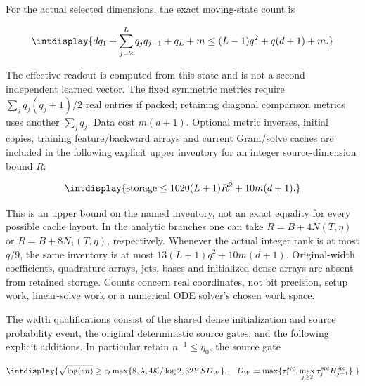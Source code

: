 
For the actual selected dimensions, the exact moving-state count is


\begingroup\renewcommand{\theHequation}{intdisplay.193}
\begin{equation}
\intdisplay{
dq_1+\sum_{j=2}^Lq_jq_{j-1}+q_L+m
\le(L-1)q^2+q(d+1)+m.
}
\label{int:eq-0081-harmonic-exact-learned-count}
\end{equation}
\endgroup


The effective readout is computed from this state and is not a second independent learned vector. The fixed symmetric metrics require \(\sum_jq_j(q_j+1)/2\) real entries if packed; retaining diagonal comparison metrics uses another \(\sum_jq_j\). Data cost \(m(d+1)\). Optional metric inverses, initial copies, training feature/backward arrays and current Gram/solve caches are included in the following explicit upper inventory for an integer source-dimension bound \(R\):


\begingroup\renewcommand{\theHequation}{intdisplay.194}
\begin{equation}
\intdisplay{
\operatorname{storage}\le1020(L+1)R^2+10m(d+1).
}
\label{int:eq-0082-harmonic-all-retained-inventory}
\end{equation}
\endgroup


This is an upper bound on the named inventory, not an exact equality for every possible cache layout. In the analytic branches one can take \(R=B+4N(T,\allowbreak \eta)\) or \(R=B+8N_1(T,\allowbreak \eta)\), respectively. Whenever the actual integer rank is at most \(q/9\), the same inventory is at most \(13(L+1)q^2+10m(d+1)\). Original-width coefficients, quadrature arrays, jets, bases and initialized dense arrays are absent from retained storage. Counts concern real coordinates, not bit precision, setup work, linear-solve work or a numerical ODE solver's chosen work space.



The width qualifications consist of the shared dense initialization and source probability event, the original deterministic source gates, and the following explicit additions. In particular retain \(n^{-1}\le\eta_0\), the source gate


\begingroup\renewcommand{\theHequation}{intdisplay.195}
\begin{equation}
\intdisplay{
\sqrt{\log(en)}\ge c_t\max\{8,\lambda,
              4\mathcal K/\log2,32YSD_W\},\quad
D_W=\max\{\tau_1^{\rm src},\max_{j\ge2}\tau_j^{\rm src}H_{j-1}^{\rm src}\}.
}
\label{int:eq-0083-harmonic-original-radius-gate}
\end{equation}
\endgroup

